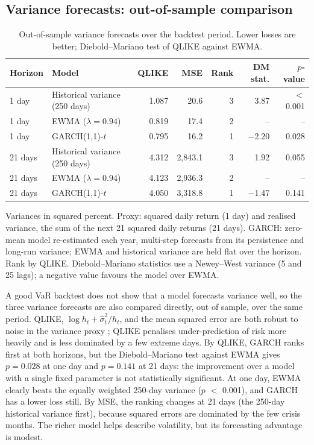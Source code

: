 \documentclass[11pt,a4paper]{article}
\newcommand{\keep}[1]{\Needspace{#1\baselineskip}}
\newcommand{\note}[1]{{\footnotesize\color{muted}#1\par}}
\begin{document}
\keep{16}\subsection{Variance forecasts: out-of-sample comparison}
\begin{table}[H]
\small
\caption{Out-of-sample variance forecasts over the backtest period. Lower losses are better; Diebold--Mariano test of QLIKE against EWMA.}
\begin{tabularx}{\linewidth}{l L r r r r r}
\toprule
\textbf{Horizon} & \textbf{Model} & \textbf{QLIKE} & \textbf{MSE} & \textbf{Rank} & \textbf{DM stat.} & \textbf{$p$-value} \\
 day & Historical variance (250 days) & 1.087 & 20.6 & 3 & 3.87 & $<$ 0.001 \\
1 day & EWMA ($\lambda = 0.94$) & 0.819 & 17.4 & 2 & -- & -- \\
1 day & GARCH(1,1)-$t$ & 0.795 & 16.2 & 1 & $-$2.20 & 0.028 \\
\midrule{}21 days & Historical variance (250 days) & 4.312 & 2,843.1 & 3 & 1.92 & 0.055 \\
21 days & EWMA ($\lambda = 0.94$) & 4.123 & 2,936.3 & 2 & -- & -- \\
21 days & GARCH(1,1)-$t$ & 4.050 & 3,318.8 & 1 & $-$1.47 & 0.141 \\
\bottomrule
\end{tabularx}
\end{table}
\note{Variances in squared percent. Proxy: squared daily return (1 day) and realised variance, the sum of the next 21 squared daily returns (21 days). GARCH: zero-mean model re-estimated each year, multi-step forecasts from its persistence and long-run variance; EWMA and historical variance are held flat over the horizon. Rank by QLIKE. Diebold--Mariano statistics use a Newey--West variance (5 and 25 lags); a negative value favours the model over EWMA.}

A good VaR backtest does not show that a model forecasts variance well, so the three variance forecasts are also compared directly, out of sample, over the same period. QLIKE, $\log h_t + \hat\sigma_t^2/h_t$, and the mean squared error are both robust to noise in the variance proxy \citep{patton2011}; QLIKE penalises under-prediction of risk more heavily and is less dominated by a few extreme days. By QLIKE, GARCH ranks first at both horizons, but the Diebold--Mariano test \citep{diebold1995} against EWMA gives $p = 0.028$ at one day and $p = 0.141$ at 21 days: the improvement over a model with a single fixed parameter is not statistically significant. At one day, EWMA clearly beats the equally weighted 250-day variance ($p$ $<$ 0.001), and GARCH has a lower loss still. By MSE, the ranking changes at 21 days (the 250-day historical variance first), because squared errors are dominated by the few crisis months. The richer model helps describe volatility, but its forecasting advantage is modest.
\end{document}
